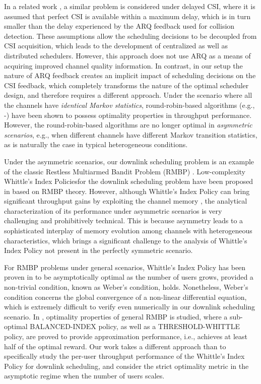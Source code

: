 \documentclass[11pt,twocolumn]{IEEEtran}
\begin{document}
In a related work \cite{YingShakkottai}, a similar problem is
considered under delayed CSI, where it is assumed that
perfect CSI is available within a maximum delay, which is in turn smaller than the delay experienced by the ARQ feedback used for collision detection. These assumptions allow  the scheduling decisions to be
decoupled from CSI acquisition, which leads to the
development of centralized as well as distributed
schedulers. However, this approach does not use ARQ as a means of acquiring improved channel quality information. In contrast, in our setup the nature of ARQ feedback creates an implicit impact of scheduling
decisions on the CSI feedback, which completely transforms the nature of
the optimal scheduler design, and therefore requires a different
approach. Under the scenario where all the channels have
\emph{identical Markov statistics},
round-robin-based algorithms (e.g., \cite{Liu}-\cite{Neely_utility}) have
been shown to possess optimality properties in throughput performance.
However, the round-robin-based algorithms are no longer optimal in
\emph{asymmetric scenarios}, e.g., when different channels have different
Markov transition statistics, as is naturally the case in typical
heterogeneous conditions.



Under the asymmetric scenarios, our downlink scheduling problem is an example of the classic Restless Multiarmed Bandit Problem
(RMBP) \cite{Whittle}. Low-complexity Whittle's Index Policies\hspace{3pt}\cite{Whittle}\hspace{3pt}for the downlink scheduling problem have been
proposed in \cite{Zhao_index}\cite{Infocom11} based on RMBP theory.
However, although Whittle's Index Policy can bring significant
throughput gains by exploiting the channel memory \cite{Infocom11},
the analytical characterization of its performance under asymmetric
scenarios is very challenging and prohibitively technical. This is because asymmetry leads to a sophisticated interplay of memory evolution among channels with heterogeneous characteristics, which brings a significant challenge to the analysis of Whittle's Index Policy not present in the perfectly symmetric scenario. 



For RMBP problems under general scenarios, Whittle's Index Policy has been proven in \cite{Weber} to be asymptotically optimal
as the number of users grows, provided a non-trivial condition,
known as Weber's condition, holds. Nonetheless, Weber's condition
concerns the global convergence of a non-linear differential
equation, which is extremely difficult to verify even
numerically in our downlink scheduling scenario. In \cite{ApproxRMBP}, optimality properties of general RMBP is studied, where a sub-optimal BALANCED-INDEX policy, as well as a THRESHOLD-WHITTLE policy, are proved to provide approximation performance, i.e., achieves at least half of the optimal reward. Our work takes a different approach than \cite{ApproxRMBP} to specifically study the per-user throughput performance of the Whittle's Index Policy for downlink scheduling, and consider the strict optimality metric in the asymptotic regime when the number of users scales. 
\end{document}
